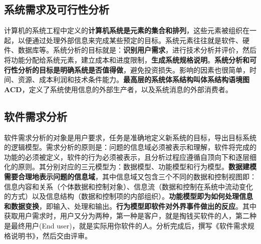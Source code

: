 \documentclass[chapter.computer_science.tex]{subfiles}
\begin{document}
\subsection{系统需求及可行性分析}
计算机的系统工程中定义的{\bfseries 计算机系统是元素的集合和排列}，这些元素被组织在一起，以便通过处理外部信息来完成某些预定的目标。系统元素往往就是软件、硬件、数据库等。系统分析的目标就是：{\bfseries 识别用户需求}，进行技术分析并评价，然后将功能分配给系统元素，建立成本和进度限制，{\bfseries 生成系统规格说明}。{\bfseries 系统分析和可行性分析的目标是明确系统是否值得做}，避免投资损失。影响的因素也很简单，时间、资源、成本利润和技术条件能力。{\bfseries 最高层的系统体系结构叫体系结构语境图ACD}，定义了系统使用信息的外部生产者，以及系统消息的外部消费者。

\subsection{软件需求分析}
软件需求分析的对象是用户要求，任务是准确地定义新系统的目标，导出目标系统的逻辑模型。需求分析的原则是：问题的信息域必须被表示和理解，软件将完成的功能的必须被定义，软件的行为必须被表示，且分析过程应遵循自顶向下和逐层细化的原则。其分别对应的三元模型为：数据模型、功能模型和行为模型。{\bfseries 数据建模需要合理地表示问题的信息域}，其中信息域又包含三个不同的数据和控制视图即：信息内容和关系（个体数据和控制对象）、信息流（数据和控制在系统中流动变化的方式）以及信息结构（数据和控制项的内部组织）。{\bfseries 功能模型即为如何处理信息和数据变换}，即输入、处理和输出。{\bfseries 行为模型即软件对外界事件做出的反应}。其中获取用户需求时，用户又分为两种，第一种是客户，就是掏钱买软件的人，第二种是最终用户(End user)，就是实际用你软件的人。分析完成后，撰写《软件需求规格说明书》，然后交由评审。
\end{document}
